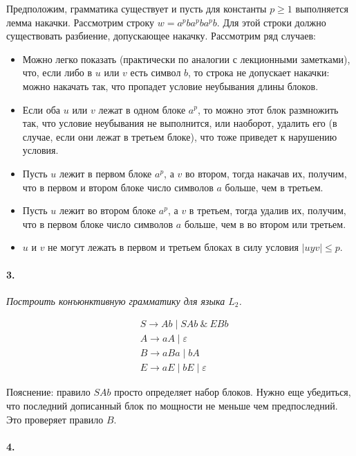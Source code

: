 \documentclass[russian]{article}
\begin{document}
Предположим, грамматика существует и пусть для константы $p \geqslant 1$ выполняется лемма накачки. Рассмотрим строку $w = a^pba^pba^pb$. Для этой строки должно существовать разбиение, допускающее накачку. Рассмотрим ряд случаев:

\begin{itemize}
\item Можно легко показать (практически по аналогии с лекционными заметками), что, если либо в $u$ или $v$ есть символ $b$, то строка не допускает накачки: можно накачать так, что пропадет условие неубывания длины блоков.
\item Если оба $u$ или $v$ лежат в одном блоке $a^p$, то можно этот блок размножить так, что условие неубывания не выполнится, или наоборот, удалить его (в случае, если они лежат в третьем блоке), что тоже приведет к нарушению условия.
\item Пусть $u$ лежит в первом блоке $a^p$, а $v$ во втором, тогда накачав их, получим, что в первом и втором блоке число символов $a$ больше, чем в третьем.
\item Пусть $u$ лежит во втором блоке $a^p$, а $v$ в третьем, тогда удалив их, получим, что в первом блоке число символов $a$ больше, чем в во втором или третьем.
\item $u$ и $v$ не могут лежать в первом и третьем блоках в силу условия $|uyv| \leqslant p$.
\end{itemize}



\paragraph*{3.}

\textit{Построить конъюнктивную грамматику для языка $L_2$.}

\begin{align*}
& S \to Ab \mid SAb\ \&\ EBb \\
& A \to aA \mid \varepsilon \\
& B \to aBa \mid bA \\
& E \to aE \mid bE \mid \varepsilon
\end{align*}

Пояснение: правило $SAb$ просто определяет набор блоков. Нужно еще убедиться, что последний дописанный блок по мощности не меньше чем предпоследний. Это проверяет правило $B$.

\paragraph*{4.}
\end{document}
